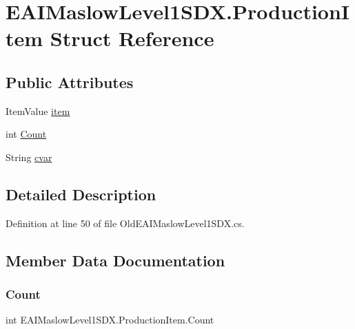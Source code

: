 \hypertarget{struct_e_a_i_maslow_level1_s_d_x_1_1_production_item}{}\section{E\+A\+I\+Maslow\+Level1\+S\+D\+X.\+Production\+Item Struct Reference}
\label{struct_e_a_i_maslow_level1_s_d_x_1_1_production_item}
\subsection*{Public Attributes}
\begin{DoxyCompactItemize}
\item 
Item\+Value \mbox{\hyperlink{struct_e_a_i_maslow_level1_s_d_x_1_1_production_item_a60182809129a3797be97a599bcc8d7ca}{item}}
\item 
int \mbox{\hyperlink{struct_e_a_i_maslow_level1_s_d_x_1_1_production_item_a7de6e94343a8676c50db9288f78af013}{Count}}
\item 
String \mbox{\hyperlink{struct_e_a_i_maslow_level1_s_d_x_1_1_production_item_a7817855d908c8afe77891173c8419e0d}{cvar}}
\end{DoxyCompactItemize}


\subsection{Detailed Description}


Definition at line 50 of file Old\+E\+A\+I\+Maslow\+Level1\+S\+D\+X.\+cs.



\subsection{Member Data Documentation}
\mbox{\label{struct_e_a_i_maslow_level1_s_d_x_1_1_production_item_a7de6e94343a8676c50db9288f78af013}} 
\subsubsection{\texorpdfstring{Count}{Count}}
{\footnotesize\ttfamily int E\+A\+I\+Maslow\+Level1\+S\+D\+X.\+Production\+Item.\+Count}




